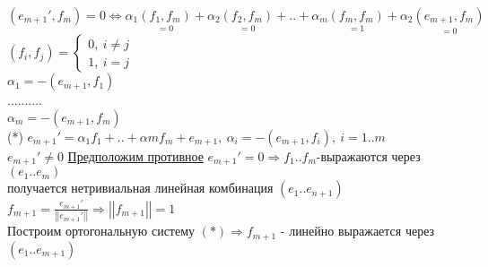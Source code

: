 $(e_{m+1}',f_m)=0 \Leftrightarrow \alpha_1 \underset {=0} {(f_1,f_m)} + \alpha_2 \underset {=0} {(f_2,f_m)} + .. + \alpha_m \underset {=1} {(f_m,f_m)} + \alpha_2 \underset {=0} {(e_{m+1},f_m)}$ \\
$(f_i,f_j) = \left\{ \begin{matrix}
\mbox{$0, \ i \ne j $} \\
\mbox{$1, \ i=j$}
\end{matrix}\right.$ \\
$\alpha_1=-(e_{m+1},f_1)$ \\
.......... \\
$\alpha_m=-(e_{m+1},f_m)$ \\
(*) $e_{m+1}'=\alpha_1 f_1 + .. + \alpha m f_m + e_{m+1}, \ \alpha_i=-(e_{m+1},f_i), \ i=1..m$ \\
$e_{m+1}' \ne 0 $ \underline{Предположим противное} $e_{m+1}'=0 \Rightarrow f_1..f_m$-выражаются через $(e_1..e_m)$ \\
получается нетривиальная линейная комбинация $(e_1..e_{n+1})$ \\
$f_{m+1}=\frac{e_{m+1}'}{\left| \left| e_{m+1}' \right| \right|} \Rightarrow \left| \left| f_{m+1} \right| \right| =1 $ \\
Построим ортогональную систему $ (*) \Rightarrow f_{m+1}$ - линейно выражается через $(e_1..e_{m+1})$ \\ 
